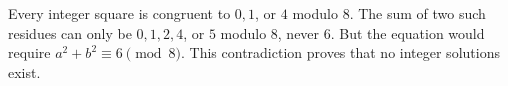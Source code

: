 Every integer square is congruent to $0,1$, or $4$ modulo $8$. The sum of two such residues can only be $0,1,2,4$, or $5$ modulo $8$, never $6$. But the equation would require $a^2+b^2\equiv6\pmod8$. This contradiction proves that no integer solutions exist.
